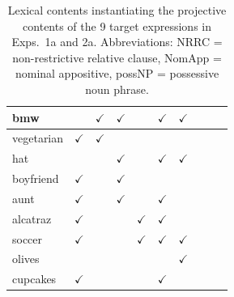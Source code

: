 \documentclass[11pt,fleqn]{article}
\newcommand{\6}{\mbox{$[\hspace*{-.6mm}[$}}
\newcommand{\9}{\mbox{$]\hspace*{-.6mm}]$}}
\begin{document}
\begin{table}[h!]
\begin{center}
\begin{tabular}{l|ccccccccc}
\hline

bmw & & $\checkmark$ & $\checkmark$ & & $\checkmark$ & $\checkmark$ & & &  \\

\hline

vegetarian & $\checkmark$ & $\checkmark$& & & & & & &  \\

\hline

hat & & & $\checkmark$ & & $\checkmark$ & $\checkmark$ & & &  \\

\hline

boyfriend & $\checkmark$ & & $\checkmark$ & & & & & &  \\

\hline

aunt & $\checkmark$ & & $\checkmark$ & & $\checkmark$ & & & &  \\

\hline

alcatraz & $\checkmark$ & & & $\checkmark$ & $\checkmark$ & & & &  \\

\hline

soccer & $\checkmark$ & & & $\checkmark$ & $\checkmark$ & $\checkmark$ & & &  \\

\hline

olives & & & & & & $\checkmark$ & & &  \\

\hline

cupcakes & $\checkmark$ & & & & $\checkmark$ & & & &  \\

\hline

\end{tabular}
\end{center}
\caption{Lexical contents instantiating the projective contents of the 9 target expressions in Exps.~1a and 2a. Abbreviations: NRRC = non-restrictive relative clause, NomApp = nominal appositive, possNP = possessive noun phrase.}\label{t-trigger-content-pairs}
\end{table}
\end{document}
